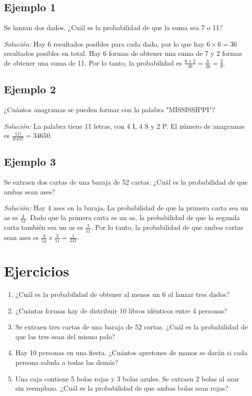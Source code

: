 \documentclass[letterpaper, 12pt]{article}
\begin{document}
	\subsection*{Ejemplo 1}
	Se lanzan dos dados. ¿Cuál es la probabilidad de que la suma sea 7 o 11?
	
	\textit{Solución:} Hay 6 resultados posibles para cada dado, por lo que hay $6 \times 6 = 36$ resultados posibles en total. Hay 6 formas de obtener una suma de 7 y 2 formas de obtener una suma de 11. Por lo tanto, la probabilidad es $\frac{6 + 2}{36} = \frac{8}{36} = \frac{2}{9}$.
	
	\subsection*{Ejemplo 2}
	¿Cuántos anagramas se pueden formar con la palabra "MISSISSIPPI"?
	
	\textit{Solución:} La palabra tiene 11 letras, con 4 I, 4 S y 2 P. El número de anagramas es $\frac{11!}{4!4!2!} = 34650$.
	
	\subsection*{Ejemplo 3}
	Se extraen dos cartas de una baraja de 52 cartas. ¿Cuál es la probabilidad de que ambas sean ases?
	
	\textit{Solución:} Hay 4 ases en la baraja. La probabilidad de que la primera carta sea un as es $\frac{4}{52}$. Dado que la primera carta es un as, la probabilidad de que la segunda carta también sea un as es $\frac{3}{51}$. Por lo tanto, la probabilidad de que ambas cartas sean ases es $\frac{4}{52} \times \frac{3}{51} = \frac{1}{221}$.
	
	\section{Ejercicios}
	
	\begin{enumerate}
		\item ¿Cuál es la probabilidad de obtener al menos un 6 al lanzar tres dados?
		\item ¿Cuántas formas hay de distribuir 10 libros idénticos entre 4 personas?
		\item Se extraen tres cartas de una baraja de 52 cartas. ¿Cuál es la probabilidad de que las tres sean del mismo palo?
		\item Hay 10 personas en una fiesta. ¿Cuántos apretones de manos se darán si cada persona saluda a todas las demás?
		\item Una caja contiene 5 bolas rojas y 3 bolas azules. Se extraen 2 bolas al azar sin reemplazo. ¿Cuál es la probabilidad de que ambas bolas sean rojas?
	\end{enumerate}
	
\end{document}
